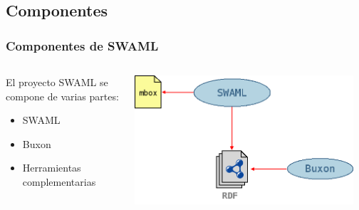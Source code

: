 \documentclass[spanish,notes=hide]{beamer}
\begin{document}
\subsection{Componentes}
\frame
{
  \frametitle{Componentes de SWAML}

  \begin{columns}
   \begin{column}{0.35\textwidth}
	El proyecto SWAML se compone de varias partes:
	\begin{itemize}
	 \item \begin{Large}SWAML\end{Large}
	 \item \begin{Large}Buxon\end{Large}
	 \item Herramientas complementarias
	\end{itemize}
   \end{column}
   \begin{column}{0.65\textwidth}
	\includegraphics[width=0.95\textwidth]{images/swaml.png}
   \end{column}
  \end{columns}
}
\end{document}
